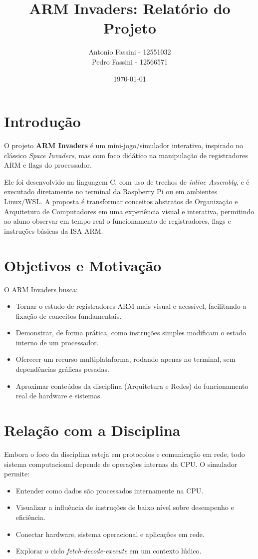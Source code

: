 \documentclass[12pt,a4paper]{report}
\title{ARM Invaders: Relatório do Projeto}
\author{Antonio Fassini - 12551032 \\ Pedro Fassini - 12566571 }
\date{\today}
\begin{document}
\maketitle
\tableofcontents
\onehalfspacing

\chapter{Introdução}
O projeto \textbf{ARM Invaders} é um mini-jogo/simulador interativo, inspirado no clássico \textit{Space Invaders}, mas com foco didático na manipulação de registradores ARM e flags do processador.  

Ele foi desenvolvido na linguagem C, com uso de trechos de \textit{inline Assembly}, e é executado diretamente no terminal da Raspberry Pi ou em ambientes Linux/WSL.  
A proposta é transformar conceitos abstratos de Organização e Arquitetura de Computadores em uma experiência visual e interativa, permitindo ao aluno observar em tempo real o funcionamento de registradores, flags e instruções básicas da ISA ARM.

\chapter{Objetivos e Motivação}
O ARM Invaders busca:
\begin{itemize}
    \item Tornar o estudo de registradores ARM mais visual e acessível, facilitando a fixação de conceitos fundamentais.
    \item Demonstrar, de forma prática, como instruções simples modificam o estado interno de um processador.
    \item Oferecer um recurso multiplataforma, rodando apenas no terminal, sem dependências gráficas pesadas.
    \item Aproximar conteúdos da disciplina (Arquitetura e Redes) do funcionamento real de hardware e sistemas.
\end{itemize}

\chapter{Relação com a Disciplina}
Embora o foco da disciplina esteja em protocolos e comunicação em rede, todo sistema computacional depende de operações internas da CPU.  
O simulador permite:
\begin{itemize}
    \item Entender como dados são processados internamente na CPU.
    \item Visualizar a influência de instruções de baixo nível sobre desempenho e eficiência.
    \item Conectar hardware, sistema operacional e aplicações em rede.
    \item Explorar o ciclo \textit{fetch-decode-execute} em um contexto lúdico.
\end{itemize}
\end{document}
